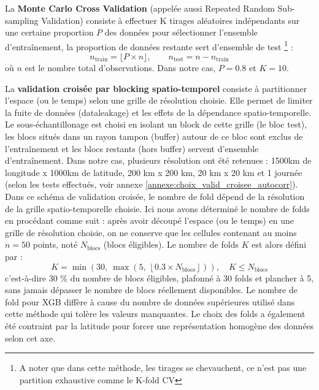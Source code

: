 \documentclass[11pt,a4paper,oneside]{report}
\begin{document}
	\vspace{0.5cm}
	
	La \textbf{Monte Carlo Cross Validation} \cite{xu2004monte} (appelée aussi Repeated Random Sub-sampling Validation) consiste à effectuer K tirages aléatoires indépendants sur une certaine proportion $P$ des données pour sélectionner l'ensemble d'entraînement, la proportion de données restante sert d'ensemble de test \footnote{A noter que dans cette méthode, les tirages se chevauchent, ce n'est pas une partition exhaustive comme le K-fold CV} :
	\begin{equation}
		n_{\text{train}} = \lfloor P \times n \rfloor, \qquad n_{\text{test}} = n - n_{\text{train}}
	\end{equation}
	où $n$ est le nombre total d'observations. Dans notre cas, $P = 0.8$ et $K = 10$.
	
	\vspace{0.5cm}
	
	La \textbf{validation croisée par blocking spatio-temporel} \cite{roberts2017crossvalidation} consiste à partitionner l'espace (ou le temps) selon une grille de résolution choisie. Elle permet de limiter la fuite de données (dataleakage) et les effets de la dépendance spatio-temporelle. Le sous-échantillonage est choisi en isolant un block de cette grille (le bloc test), les blocs situés dans un rayon tampon (buffer) autour de ce bloc sont exclus de l'entraînement et les blocs restants (hors buffer) servent d'ensemble d'entraînement. Dans notre cas, plusieurs résolution ont été retenues : 1500km de longitude x 1000km de latitude, 200 km x 200 km, 20 km x 20 km et 1 journée (selon les tests effectués, voir annexe \ref{annexe:choix_valid_croisee_autocorr}). Dans ce schéma de validation croisée, le nombre de fold dépend de la résolution de la grille spatio-temporelle choisie. 
	Ici nous avons déterminé le nombre de folds en procédant comme suit : après avoir découpé l'espace (ou le temps) en une grille de résolution choisie, on ne conserve que les cellules contenant au moins $n = 50$ points, noté $N_{\text{blocs}}$ (blocs éligibles). Le nombre de folds $K$ est alors défini par :
	\begin{equation}
		K = \min\left(30,\ \max\left(5,\ \left\lfloor 0.3 \times N_{\text{blocs}} \right\rfloor\right)\right), \quad K \leq N_{\text{blocs}}
	\end{equation}
	c'est-à-dire 30 \% du nombre de blocs éligibles, plafonné à 30 folds et plancher à 5, sans jamais dépasser le nombre de blocs réellement disponibles. Le nombre de fold pour XGB diffère à cause du nombre de données supérieures utilisé dans cette méthode qui tolère les valeurs manquantes. Le choix des folds a également été contraint par la latitude pour forcer une représentation homogène des données selon cet axe.
	
\end{document}

